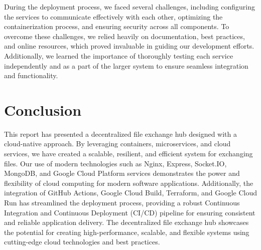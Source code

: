 \documentclass[a4paper,fleqn]{cas-dc}
\begin{document}
During the deployment process, we faced several challenges, including configuring the services to communicate effectively with each other, optimizing the containerization process, and ensuring security across all components. To overcome these challenges, we relied heavily on documentation, best practices, and online resources, which proved invaluable in guiding our development efforts. Additionally, we learned the importance of thoroughly testing each service independently and as a part of the larger system to ensure seamless integration and functionality.

\section{Conclusion}

This report has presented a decentralized file exchange hub designed with a cloud-native approach. By leveraging containers, microservices, and cloud services, we have created a scalable, resilient, and efficient system for exchanging files. Our use of modern technologies such as Nginx, Express, Socket.IO, MongoDB, and Google Cloud Platform services demonstrates the power and flexibility of cloud computing for modern software applications. Additionally, the integration of GitHub Actions, Google Cloud Build, Terraform, and Google Cloud Run has streamlined the deployment process, providing a robust Continuous Integration and Continuous Deployment (CI/CD) pipeline for ensuring consistent and reliable application delivery. The decentralized file exchange hub showcases the potential for creating high-performance, scalable, and flexible systems using cutting-edge cloud technologies and best practices.

%
%
%


\end{document}
